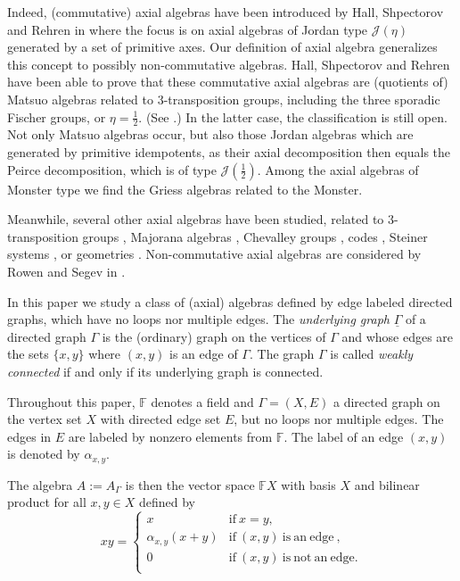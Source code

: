 \documentclass[oneside,a4paper]{amsart} %
\theoremstyle{definition}
\begin{document}
Indeed, (commutative) axial algebras have been introduced by Hall, Shpectorov and Rehren in \cite{hrs} where the focus is on axial algebras of Jordan type $\mathcal{J}(\eta)$ generated by a set of primitive axes. Our definition of axial algebra generalizes this concept to possibly non-commutative algebras.
Hall,  Shpectorov and Rehren  have been able to  prove that these commutative axial algebras are (quotients of) Matsuo algebras related to $3$-transposition groups, including the three sporadic Fischer groups, or $\eta=\frac{1}{2}$. (See \cite{hrs}.)
In the latter case, the classification is still open. Not only Matsuo algebras occur, but also those Jordan algebras which are generated by primitive idempotents, as their axial decomposition then equals the Peirce decomposition, which is of type  $\mathcal{J}(\frac{1}{2})$.
Among the axial algebras of Monster type we find the Griess algebras related to the Monster.

Meanwhile, several other axial algebras have been studied, related to $3$-trans\-po\-sition groups \cite{hrs,joshi,alsaeedi}, Majorana algebras \cite{majorana}, Chevalley groups \cite{demedts}, codes \cite{codealgebras}, Steiner systems \cite{fox}, or geometries \cite{hans}.  
Non-commutative axial algebras are considered  by Rowen and Segev in \cite{segev1,segev2,segev3}.


In this paper we study a class of (axial) algebras defined by edge labeled directed graphs, which have no loops nor multiple edges.
The \emph{underlying graph} $\underline\Gamma$  of a directed graph $\Gamma$ is the (ordinary) graph on the vertices of $\Gamma$ and whose edges are the sets $\{x,y\}$
where $(x,y)$ is an edge of $\Gamma$. The graph $\Gamma$ is called \emph{weakly connected} if and only if its underlying graph is connected.

Throughout this paper, $\mathbb{F}$ denotes a field and  $\Gamma=(X,E)$ a directed graph 
on the vertex set $X$ with directed edge set $E$, but no loops nor multiple edges.
The edges in $E$ are labeled by nonzero elements from $\mathbb{F}$.
The label of an edge $(x,y)$ is denoted by  $\alpha_{x,y}$. 

The algebra $A:=A_{\Gamma}$
is then  the vector space $\mathbb{F}X$ with basis $X$ and bilinear product for all $x,y\in X$ defined by
$$xy=\begin{cases}
x&\mathrm{if}\ x=y,\\
\alpha_{x,y} (x+y)&\mathrm{if}\ (x, y) \ \mathrm{is\ an\ edge\ },\\
0&\mathrm{if}\ (x,y)\ \mathrm{is \ not \ an \ edge}.\\
\end{cases}$$
\end{document}
